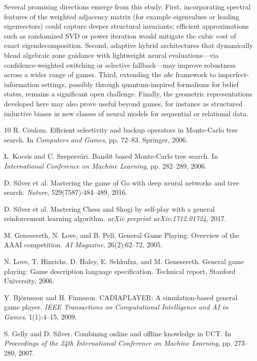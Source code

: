 \documentclass[11pt,a4paper]{article}
\theoremstyle{plain}
\theoremstyle{definition}
\begin{document}
Several promising directions emerge from this study. First, incorporating spectral features of the weighted adjacency matrix (for example eigenvalues or leading eigenvectors) could capture deeper structural invariants; efficient approximations such as randomized SVD or power iteration would mitigate the cubic cost of exact eigendecomposition. Second, adaptive hybrid architectures that dynamically blend algebraic zone guidance with lightweight neural evaluations—via confidence-weighted switching or selective fallback—may improve robustness across a wider range of games. Third, extending the \(abc\) framework to imperfect-information settings, possibly through quantum-inspired formalisms for belief states, remains a significant open challenge. Finally, the geometric representations developed here may also prove useful beyond games, for instance as structured inductive biases in new classes of neural models for sequential or relational data.

\vspace{0.5em}

\newpage

\begin{thebibliography}{10}
R. Coulom.
Efficient selectivity and backup operators in Monte-Carlo tree search.
In \emph{Computers and Games}, pp. 72--83. Springer, 2006.

L. Kocsis and C. Szepesvári.
Bandit based Monte-Carlo tree search.
In \emph{International Conference on Machine Learning}, pp. 282--289, 2006.

D. Silver et al.
Mastering the game of Go with deep neural networks and tree search.
\emph{Nature}, 529(7587):484--489, 2016.

D. Silver et al.
Mastering Chess and Shogi by self-play with a general reinforcement learning algorithm.
\emph{arXiv preprint arXiv:1712.01724}, 2017.

M. Genesereth, N. Love, and B. Pell.
General Game Playing: Overview of the AAAI competition.
\emph{AI Magazine}, 26(2):62--72, 2005.

N. Love, T. Hinrichs, D. Haley, E. Schkufza, and M. Genesereth.
General game playing: Game description language specification.
Technical report, Stanford University, 2006.

Y. Bj\"{o}rnsson and H. Finnsson.
CADIAPLAYER: A simulation-based general game player.
\emph{IEEE Transactions on Computational Intelligence and AI in Games}, 1(1):4--15, 2009.

S. Gelly and D. Silver.
Combining online and offline knowledge in UCT.
In \emph{Proceedings of the 24th International Conference on Machine Learning}, pp. 273--280, 2007.
\end{thebibliography}
\end{document}
